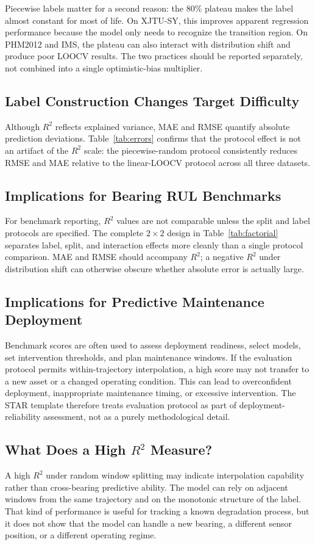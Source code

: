 \documentclass[pdflatex,sn-mathphys-num]{sn-jnl}
\begin{document}
Piecewise labels matter for a second reason: the 80\% plateau makes the label almost constant for most of life. On XJTU-SY, this improves apparent regression performance because the model only needs to recognize the transition region. On PHM2012 and IMS, the plateau can also interact with distribution shift and produce poor LOOCV results. The two practices should be reported separately, not combined into a single optimistic-bias multiplier.
\subsection{Label Construction Changes Target Difficulty}

Although $R^2$ reflects explained variance, MAE and RMSE quantify absolute prediction deviations. Table~\ref{tab:errors} confirms that the protocol effect is not an artifact of the $R^2$ scale: the piecewise-random protocol consistently reduces RMSE and MAE relative to the linear-LOOCV protocol across all three datasets.

\subsection{Implications for Bearing RUL Benchmarks}
For benchmark reporting, $R^2$ values are not comparable unless the split and label protocols are specified. The complete $2 \times 2$ design in Table~\ref{tab:factorial} separates label, split, and interaction effects more cleanly than a single protocol comparison. MAE and RMSE should accompany $R^2$; a negative $R^2$ under distribution shift can otherwise obscure whether absolute error is actually large.

\subsection{Implications for Predictive Maintenance Deployment}
Benchmark scores are often used to assess deployment readiness, select models, set intervention thresholds, and plan maintenance windows. If the evaluation protocol permits within-trajectory interpolation, a high score may not transfer to a new asset or a changed operating condition. This can lead to overconfident deployment, inappropriate maintenance timing, or excessive intervention. The STAR template therefore treats evaluation protocol as part of deployment-reliability assessment, not as a purely methodological detail.

\subsection{What Does a High $R^2$ Measure?}
A high $R^2$ under random window splitting may indicate interpolation capability rather than cross-bearing predictive ability. The model can rely on adjacent windows from the same trajectory and on the monotonic structure of the label. That kind of performance is useful for tracking a known degradation process, but it does not show that the model can handle a new bearing, a different sensor position, or a different operating regime.
\end{document}
